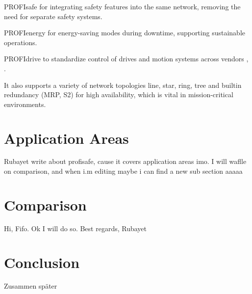 \documentclass[conference]{IEEEtran}
\begin{document}
PROFIsafe for integrating safety features into the same network, removing the need for separate safety systems.

PROFIenergy for energy-saving modes during downtime, supporting sustainable operations.

PROFIdrive to standardize control of drives and motion systems across vendors \cite{galloway2012industrial}, \cite{jasperneite2007limits}.

It also supports a variety of network topologies line, star, ring, tree and builtin redundancy (MRP, S2) for high availability, which is vital in mission-critical environments.

\section{Application Areas}
Rubayet write about profisafe, cause it covers application areas imo. I will waflle on comparison, and when i.m editing maybe i can find a new sub section aaaaa
\section{Comparison}
Hi, Fifo. Ok I will do so. Best regards, Rubayet
\section{Conclusion}

Zusammen später

\printbibliography
\end{document}
